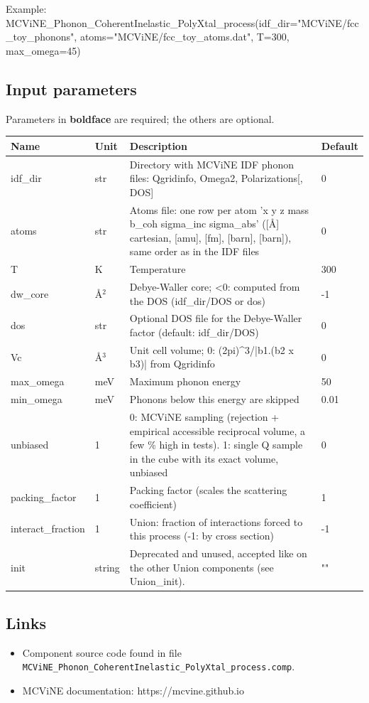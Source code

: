Example: MCViNE\_Phonon\_CoherentInelastic\_PolyXtal\_process(idf\_dir="MCViNE/fcc\_toy\_phonons", atoms="MCViNE/fcc\_toy\_atoms.dat", T=300, max\_omega=45)

\subsection*{Input parameters}
Parameters in \textbf{boldface} are required; the others are optional.

\begin{longtable}{p{}p{}p{}p{}}
\toprule
\textbf{Name} & \textbf{Unit} & \textbf{Description} & \textbf{Default} \\
\midrule
\endhead
idf\_dir & str & Directory with MCViNE IDF phonon files: Qgridinfo, Omega2, Polarizations[, DOS] & 0 \\
atoms & str & Atoms file: one row per atom 'x y z mass b\_coh sigma\_inc sigma\_abs' ([\AA{}] cartesian, [amu], [fm], [barn], [barn]), same order as in the IDF files & 0 \\
T & K & Temperature & 300 \\
dw\_core & \AA{}$^{2}$ & Debye-Waller core; \textless{}0: computed from the DOS (idf\_dir/DOS or dos) & -1 \\
dos & str & Optional DOS file for the Debye-Waller factor (default: idf\_dir/DOS) & 0 \\
Vc & \AA{}$^{3}$ & Unit cell volume; 0: (2pi)\textasciicircum{}3/|b1.(b2 x b3)| from Qgridinfo & 0 \\
max\_omega & meV & Maximum phonon energy & 50 \\
min\_omega & meV & Phonons below this energy are skipped & 0.01 \\
unbiased & 1 & 0: MCViNE sampling (rejection + empirical accessible reciprocal volume, a few \% high in tests). 1: single Q sample in the cube with its exact volume, unbiased & 0 \\
packing\_factor & 1 & Packing factor (scales the scattering coefficient) & 1 \\
interact\_fraction & 1 & Union: fraction of interactions forced to this process (-1: by cross section) & -1 \\
init & string & Deprecated and unused, accepted like on the other Union components (see Union\_init). & "" \\
\bottomrule
\end{longtable}

\subsection*{Links}
\begin{itemize}
  \item Component source code found in file \texttt{MCViNE\_Phonon\_CoherentInelastic\_PolyXtal\_process.comp}.
  \item MCViNE documentation: https://mcvine.github.io
\end{itemize}
